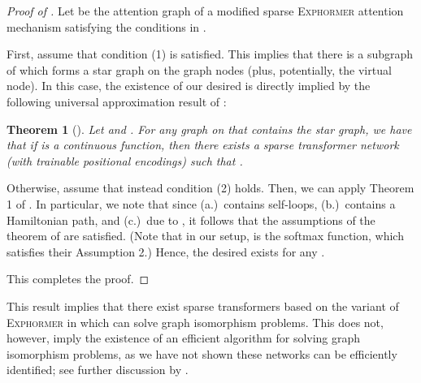 \documentclass{article}
\theoremstyle{plain}
\newtheorem{theorem}{Theorem}[section]
\theoremstyle{definition}
\theoremstyle{remark}
\begin{document}
\begin{proof}[Proof of ]
Let  be the attention graph of a modified sparse \textsc{Exphormer} attention mechanism satisfying the conditions in .

First, assume that condition (1) is satisfied. This implies that there is a subgraph of  which forms a star graph on the  graph nodes (plus, potentially, the virtual node).
In this case, the existence of our desired  is directly implied by the following universal approximation result of \citet{ZaheerGDAAOPRWY20}:
\begin{theorem}[\citealp{ZaheerGDAAOPRWY20}]\label{thm:bigbird-universality}
 Let  and . For any graph  on  that contains the star graph, we have that if  is a continuous function, then there exists a sparse transformer network  (with trainable positional encodings) such that .
\end{theorem}

Otherwise, assume that instead condition (2) holds. Then, we can apply Theorem 1 of \citet{YunCBRRK20}. In particular, we note that since (a.)\  contains self-loops, (b.)\  contains a Hamiltonian path, and (c.)\  due to , it follows that the assumptions of the theorem of \citet{YunCBRRK20} are satisfied. (Note that in our setup,  is the softmax function, which satisfies their Assumption 2.) Hence, the desired  exists for any .

This completes the proof.
\end{proof}

This result implies that there exist sparse transformers based on the variant of \textsc{Exphormer} in  which can solve graph isomorphism problems. This does not, however, imply the existence of an efficient algorithm for solving graph isomorphism problems, as we have not shown these networks can be efficiently identified; see further discussion by \citet{kreuzer2021rethinking}.
\end{document}
